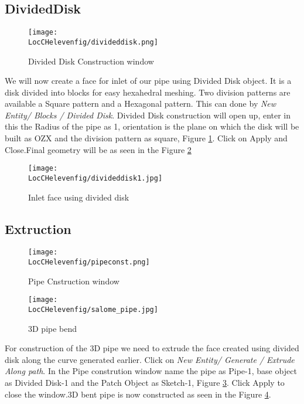 \subsection*{DividedDisk}

\begin{figure}[h]  
\centering
\texttt{[image: \\LocCHelevenfig/divideddisk.png]}
\caption{Divided Disk Construction window}
\label{disk}
\end{figure}

We will now create a face for inlet of our pipe using Divided Disk object. It is a disk divided into blocks for easy hexahedral meshing. Two division patterns are available a Square pattern and a Hexagonal pattern. This can done by \textit{ New Entity/ Blocks / Divided Disk}. Divided Disk construction will open up, enter in this the Radius of the pipe as 1, orientation is the plane on which the disk will be built as OZX and the division pattern as square, Figure \ref{disk}. Click on Apply and Close.Final geometry will be as seen in the Figure \ref{disk1} 

\begin{figure}[h]  
\centering
\texttt{[image: \\LocCHelevenfig/divideddisk1.jpg]}
\caption{Inlet face using divided disk}
\label{disk1}
\end{figure}

\subsection*{Extruction}

\begin{figure}[h]  
\centering
\texttt{[image: \\LocCHelevenfig/pipeconst.png]}
\caption{Pipe Cnstruction window}
\label{pipeconst}
\end{figure}

\begin{figure}[h]  
\centering
\texttt{[image: \\LocCHelevenfig/salome\_pipe.jpg]}
\caption{3D pipe bend}
\label{3dpipe}
\end{figure}

For construction of the 3D pipe we need to extrude the face created using divided disk along the curve generated earlier. Click on \textit{New Entity/ Generate / Extrude Along path}. In the Pipe constrution window name the pipe as Pipe-1, base object as Divided Disk-1 and the Patch Object as Sketch-1, Figure \ref{pipeconst}. Click Apply to close the window.3D bent pipe is now constructed as seen in the Figure \ref{3dpipe}.    

